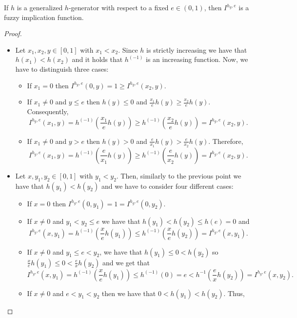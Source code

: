 \begin{proposition} If $h$ is a generalized $h$-generator with respect to a fixed $e \in (0,1)$, then $I^{h_g,e}$ is a fuzzy implication function.
\end{proposition}
\begin{proof}
	\hspace{0.5cm}
	\begin{itemize}
		\item Let $x_1,x_2,y \in [0,1]$ with $x_1 < x_2$. Since $h$ is strictly increasing we have that $h(x_1) < h(x_2)$ and it holds that $h^{(-1)}$ is an increasing function. Now, we have to distinguish three cases:
		\begin{itemize}
			\item If $x_1=0$ then $ I^{h_g,e}(0,y)=1 \geq I^{h_g,e}(x_2,y)$.
			\item If $x_1 \not = 0$ and $y \leq e$ then $h(y) \leq 0$ and $ \frac{x_1}{e}h(y) \geq  \frac{x_2}{e}h(y)$. Consequently,
			$$ I^{h_g,e}(x_1,y)=h^{(-1)}\left(\frac{x_1}{e}h(y)\right) \geq h^{(-1)}\left(\frac{x_2}{e}h(y)\right) = I^{h_g,e}(x_2,y).$$
			\item If $x_1 \not = 0$ and  $y>e$ then $h(y)>0$ and  $ \frac{e}{x_1}h(y) >  \frac{e}{x_2}h(y)$. Therefore, 
			$$ I^{h_g,e}(x_1,y)=h^{(-1)}\left(\frac{e}{x_1}h(y)\right) \geq h^{(-1)}\left(\frac{e}{x_2}h(y)\right) = I^{h_g,e}(x_2,y).$$
		\end{itemize}
		\item Let $x,y_1,y_2 \in [0,1]$ with $y_1 < y_2$. Then, similarly to the previous point we have that $h(y_1) < h(y_2)$ and we have to consider four different cases:
		\begin{itemize}
			\item If $x=0$ then $I^{h_g,e}(0,y_1)=1=I^{h_g,e}(0,y_2)$.
			\item If $x \not =0$ and $y_1 < y_2 \leq e$ we have that $ h(y_1) < h(y_2) \leq h(e)=0$ and
			$$I^{h_g,e}(x,y_1)=h^{(-1)}\left( \frac{x}{e}h(y_1) \right) \leq  h^{(-1)}\left( \frac{x}{e}h(y_2) \right) = I^{h_g,e}(x,y_1).$$
			\item If $x \not =0$ and $y_1  \leq e < y_2$, we have that $ h(y_1) \leq 0 < h(y_2)$ so $ \frac{x}{e}h(y_1)  \leq 0 <  \frac{e}{x}h(y_2)$ and we get that
			$$I^{h_g,e}(x,y_1)=h^{(-1)}\left( \frac{x}{e}h(y_1)\right) \leq 
			h^{(-1)}(0)=e < h^{-1}\left( \frac{e}{x}h(y_2) \right) = I^{h_g,e}(x,y_2).$$
			\item If $x \not = 0$ and $ e < y_1 <y_2$ then we have that $0 < h(y_1) < h(y_2)$. Thus,

\end{itemize}
\end{itemize}
\end{proof}

